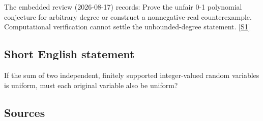 \documentclass[11pt,a4paper]{article}
\newcommand{\sref}[2]{\hyperlink{source:#1:#2}{[S#2]}}
\begin{document}
The embedded review (2026-08-17) records: Prove the unfair 0-1 polynomial conjecture for arbitrary degree or construct a nonnegative-real counterexample. Computational verification cannot settle the unbounded-degree statement. \sref{statement}{1}

\subsection{Short English statement}

If the sum of two independent, finitely supported integer-valued random variables is uniform, must each original variable also be uniform?

\subsection{Sources}
\end{document}
